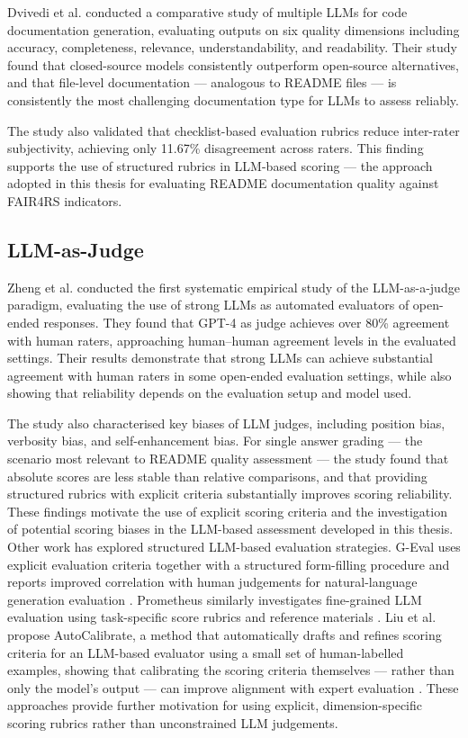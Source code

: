 Dvivedi et al. \cite{dvivedi2024llm} conducted a comparative study 
of multiple LLMs for code documentation generation, evaluating 
outputs on six quality dimensions including accuracy, completeness, 
relevance, understandability, and readability. Their study found that 
closed-source models consistently outperform open-source alternatives, 
and that file-level documentation — analogous to README files — is 
consistently the most challenging documentation type for LLMs to 
assess reliably.

The study also validated that checklist-based evaluation rubrics 
reduce inter-rater subjectivity, achieving only 11.67\% disagreement 
across raters. This finding supports the use of structured rubrics 
in LLM-based scoring — the approach adopted in this thesis for 
evaluating README documentation quality against FAIR4RS indicators.

\subsection{LLM-as-Judge}

Zheng et al. \cite{zheng2023llmjudge} conducted the first systematic 
empirical study of the LLM-as-a-judge paradigm, evaluating the use 
of strong LLMs as automated evaluators of open-ended responses. They found that GPT-4 as judge achieves over 80\% agreement with human
raters, approaching human--human agreement levels in the evaluated
settings. Their results demonstrate that strong LLMs can achieve
substantial agreement with human raters in some open-ended evaluation
settings, while also showing that reliability depends on the
evaluation setup and model used.

The study also characterised key biases of LLM judges, including 
position bias, verbosity bias, and self-enhancement bias. For single 
answer grading — the scenario most relevant to README quality 
assessment — the study found that absolute scores are less stable 
than relative comparisons, and that providing structured rubrics with 
explicit criteria substantially improves scoring reliability. These findings motivate the use of explicit scoring criteria and the
investigation of potential scoring biases in the LLM-based assessment
developed in this thesis.
Other work has explored structured LLM-based evaluation strategies.
G-Eval uses explicit evaluation criteria together with a structured
form-filling procedure and reports improved correlation with human
judgements for natural-language generation evaluation
\cite{liu2023geval}. Prometheus similarly investigates fine-grained
LLM evaluation using task-specific score rubrics and reference
materials \cite{kim2024prometheus}. Liu et al. propose AutoCalibrate,
a method that automatically drafts and refines scoring criteria for
an LLM-based evaluator using a small set of human-labelled examples,
showing that calibrating the scoring criteria themselves --- rather
than only the model's output --- can improve alignment with expert
evaluation \cite{liu2024calibrating}. These approaches provide further
motivation for using explicit, dimension-specific scoring rubrics
rather than unconstrained LLM judgements.

